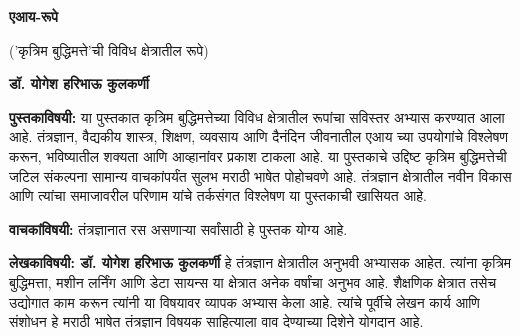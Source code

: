 \documentclass{article}
\begin{document}
\thispagestyle{empty}
\null\vfill

\begin{center}
{\fontsize{58}{78}\selectfont\color{titleorange}\textbf{एआय-रूपे}}

\vspace{1em}

{\fontsize{12}{14}\selectfont\color{subtitleblue}('कृत्रिम बुद्धिमत्ते'ची विविध क्षेत्रातील रूपे)}

\vspace{5em}

{\fontsize{16}{20}\selectfont\color{authorgreen}\textbf{डॉ. योगेश हरिभाऊ कुलकर्णी}}
\end{center}

\vfill\null
\clearpage

\thispagestyle{empty}
\vspace*{0.5in}

\noindent\textbf{पुस्तकाविषयी:} या पुस्तकात कृत्रिम बुद्धिमत्तेच्या विविध क्षेत्रातील रूपांचा सविस्तर अभ्यास करण्यात आला आहे. तंत्रज्ञान, वैद्यकीय शास्त्र, शिक्षण, व्यवसाय आणि दैनंदिन जीवनातील एआय च्या उपयोगांचे विश्लेषण करून, भविष्यातील शक्यता आणि आव्हानांवर प्रकाश टाकला आहे.  या पुस्तकाचे उद्दिष्ट कृत्रिम बुद्धिमत्तेची जटिल संकल्पना सामान्य वाचकांपर्यंत सुलभ मराठी भाषेत पोहोचवणे आहे. तंत्रज्ञान क्षेत्रातील नवीन विकास आणि त्यांचा समाजावरील परिणाम यांचे तर्कसंगत विश्लेषण या पुस्तकाची खासियत आहे.

\vspace{1.5em}

\noindent\textbf{वाचकांविषयी:} तंत्रज्ञानात रस असणाऱ्या सर्वांसाठी हे पुस्तक योग्य आहे.

\vspace{1.5em}

\noindent\textbf{लेखकाविषयी: डॉ. योगेश हरिभाऊ कुलकर्णी} हे तंत्रज्ञान क्षेत्रातील अनुभवी अभ्यासक आहेत. त्यांना कृत्रिम बुद्धिमत्ता, मशीन लर्निंग आणि डेटा सायन्स या क्षेत्रात अनेक वर्षांचा अनुभव आहे. शैक्षणिक क्षेत्रात तसेच उद्योगात काम करून त्यांनी या विषयावर व्यापक अभ्यास केला आहे. त्यांचे पूर्वीचे लेखन कार्य आणि संशोधन हे मराठी भाषेत तंत्रज्ञान विषयक साहित्याला वाव देण्याच्या दिशेने योगदान आहे.

\vfill
\end{document}

